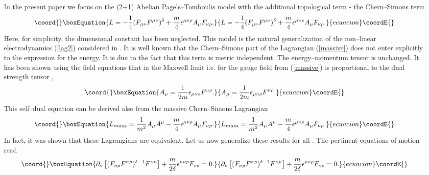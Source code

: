 \documentclass[a4 paper, 12 pt] {article}
\begin{document}
In the present paper we focus on the (2+1) Abelian
Pagels--Tomboulis model with the additional topological term -
the Chern--Simons term
\begin{equation}\coord{}\boxEquation{
L= -\frac{1}{4} (F_{\mu \nu }F^{\mu \nu } )^{\delta} +\frac{m}{4}
\epsilon^{\mu \nu \rho } A_{\mu } F_{\nu \rho }.
\label{massive}
}{
L= -\frac{1}{4} (F_{\mu \nu }F^{\mu \nu } )^{\delta} +\frac{m}{4}
\epsilon^{\mu \nu \rho } A_{\mu } F_{\nu \rho }.
}{ecuacion}\coordE{}\end{equation}
Here, for simplicity, the dimensional constant \myHighlight{$\Lambda $}\coordHE{} has been
neglected. This model is the natural generalization of the
non--linear electrodynamics (\ref{lag2}) considered in
\cite{Garcia}. It is well known that the Chern--Simons part of the
Lagrangian (\ref{massive}) does not enter explicitly to the
expression for the energy. It is due to the fact that this term is
metric independent. The energy--momentum tensor is unchanged. It
has been shown using the field equations that in the Maxwell limit i.e.
for \coordHE{} the gauge field from (\ref{massive}) is
proportional to the dual strength tensor \cite{Jackiw},
\cite{Deser}
\begin{equation}\coord{}\boxEquation{
A_{\mu }=\frac{1}{2m} \epsilon_{\mu \nu \rho} F^{\nu \rho}.
\label{maxdual}
}{
A_{\mu }=\frac{1}{2m} \epsilon_{\mu \nu \rho} F^{\nu \rho}.
}{ecuacion}\coordE{}\end{equation}
This self--dual equation can be derived also from the massive Chern--Simons
Lagrangian
\cite{Townsend}
\begin{equation}\coord{}\boxEquation{
L_{mass}=\frac{1}{m^2} A_{\mu }A^{\mu } -\frac{m}{4} \epsilon^{\mu \nu
\rho } A_{\mu } F_{\nu \rho}.
\label{maxproca}
}{
L_{mass}=\frac{1}{m^2} A_{\mu }A^{\mu } -\frac{m}{4} \epsilon^{\mu \nu
\rho } A_{\mu } F_{\nu \rho}.
}{ecuacion}\coordE{}\end{equation}
In fact, it was shown that these Lagrangians are equivalent. Let
us now generalize these results for all \coordHE{}.
The pertinent equations of motion read
\begin{equation}\coord{}\boxEquation{
\partial_{\nu } \left[ (F_{\sigma \rho }F^{\sigma \rho } )^{\delta -1} F^{\nu \mu
} \right] +\frac{m}{2 \delta } \epsilon^{\mu \nu \rho } F_{\nu \rho } =0.
\label{eqmot1}
}{
\partial_{\nu } \left[ (F_{\sigma \rho }F^{\sigma \rho } )^{\delta -1} F^{\nu \mu
} \right] +\frac{m}{2 \delta } \epsilon^{\mu \nu \rho } F_{\nu \rho } =0.
}{ecuacion}\coordE{}\end{equation}
\end{document}
